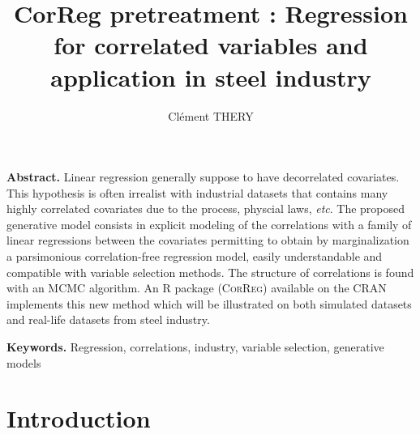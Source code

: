 \documentclass[11pt,a4paper]{article}
\author{Clément THERY}
\title{CorReg pretreatment : Regression for correlated variables and application in steel industry}
\begin{document}
\maketitle
\bigskip
{\bf Abstract.} Linear regression generally suppose to have decorrelated covariates. This hypothesis is often irrealist with industrial datasets that contains many highly correlated covariates due to the process, physcial laws,  {\it etc}. The proposed generative model consists in explicit modeling of the correlations with a family of linear regressions between the covariates permitting to obtain by marginalization a parsimonious correlation-free regression model, easily understandable and compatible with variable selection methods. The structure of correlations is found with an MCMC algorithm. An R package (\textsc{CorReg}) available on the CRAN implements this new method which will be illustrated on both simulated datasets and real-life datasets from steel industry.
\smallskip

{\bf Keywords.} Regression, correlations, industry, variable selection, generative models

\section{Introduction}
\end{document}
